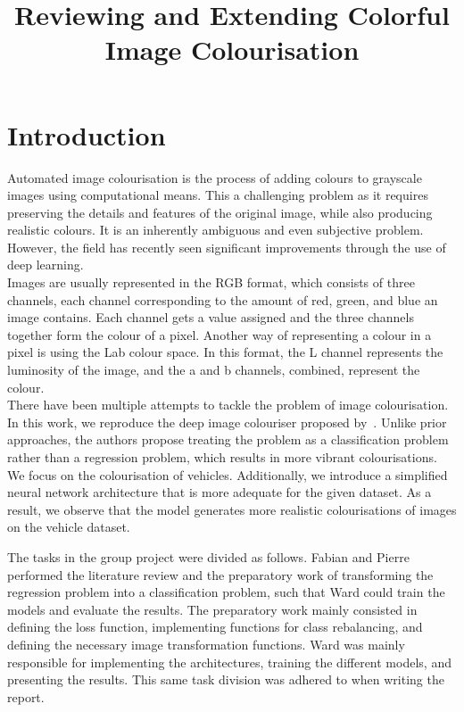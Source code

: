 \documentclass{article}
\title{Reviewing and Extending Colorful Image Colourisation}
\begin{document}
\maketitle

\section{Introduction}

Automated image colourisation is the process of adding colours to grayscale images using computational means. This a challenging problem as it requires preserving the details and features of the original image, while also producing realistic colours. It is an inherently ambiguous and even subjective problem.
However, the field has recently seen significant improvements through the use of deep learning.\\
Images are usually represented in the RGB format, which consists of three channels, each channel corresponding to the amount of red, green, and blue an image contains. Each channel gets a value assigned and the three channels together form the colour of a pixel. Another way of representing a colour in a pixel is using the Lab colour space. In this format, the L channel represents the luminosity of the image, and the a and b channels, combined, represent the colour.\\
There have been multiple attempts to tackle the problem of image colourisation. In this work, we reproduce the deep image colouriser proposed by~\cite{colourful}. Unlike prior approaches, the authors propose treating the problem as a classification problem rather than a regression problem, which results in more vibrant colourisations. We focus on the colourisation of vehicles. Additionally, we introduce a simplified neural network architecture that is more adequate for the given dataset. As a result, we observe that the model generates more realistic colourisations of images on the vehicle dataset.

The tasks in the group project were divided as follows. Fabian and Pierre performed the literature review and the preparatory work of transforming the regression problem into a classification problem, such that Ward could train the models and evaluate the results. The preparatory work mainly consisted in defining the loss function, implementing functions for class rebalancing, and defining the necessary image transformation functions. Ward was mainly responsible for implementing the architectures, training the different models, and presenting the results. This same task division was adhered to when writing the report.
\end{document}
